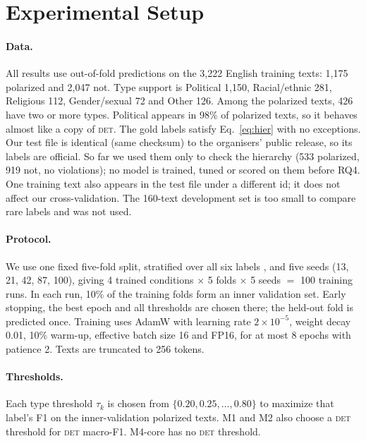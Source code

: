 \documentclass[11pt]{article}
\newcommand{\DET}{\textsc{det}}
\begin{document}
\section{Experimental Setup}
\label{sec:setup}

\paragraph{Data.}
All results use out-of-fold predictions on the 3{,}222 English training
texts: 1{,}175 polarized and 2{,}047 not. Type support is Political 1{,}150,
Racial/ethnic 281, Religious 112, Gender/sexual 72 and Other 126. Among the
polarized texts, 426 have two or more types. Political appears in 98\% of
polarized texts, so it behaves almost like a copy of \DET{}. The gold labels
satisfy Eq.~\ref{eq:hier} with no exceptions. Our test file is identical
(same checksum) to the organisers' public release, so its labels are
official. So far we used them only to check the hierarchy (533 polarized,
919 not, no violations); no model is trained, tuned or scored on them before
RQ4. One training text also appears in the test file under a different id;
it does not affect our cross-validation. The 160-text development set is too small to compare
rare labels and was not used.

\paragraph{Protocol.}
We use one fixed five-fold split, stratified over all six labels
\citep{sechidis2011}, and five seeds (13, 21, 42, 87, 100), giving
4 trained conditions $\times$ 5 folds $\times$ 5 seeds $=$ 100 training
runs. In each run, 10\% of the training folds form an inner validation set.
Early stopping, the best epoch and all thresholds are chosen there; the
held-out fold is predicted once. Training uses AdamW
\citep{loshchilov2019} with learning rate $2\times10^{-5}$, weight decay
0.01, 10\% warm-up, effective batch size 16 and FP16, for at most 8 epochs
with patience 2. Texts are truncated to 256 tokens.

\paragraph{Thresholds.}
Each type threshold $\tau_k$ is chosen from $\{0.20, 0.25, \dots, 0.80\}$
to maximize that label's F1 on the inner-validation polarized texts. M1 and
M2 also choose a \DET{} threshold for \DET{} macro-F1. M4-core has no
\DET{} threshold.
\end{document}
